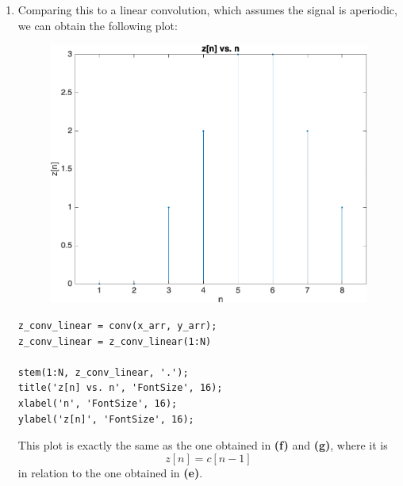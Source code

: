 \documentclass[12pt]{article}
\begin{document}
\begin{enumerate}[label=\textbf{\alph*)}, leftmargin=2.6em]
\item Comparing this to a linear convolution, which assumes the signal is aperiodic, we can obtain the following plot:
\begin{figure} [H]
    \centering
    \includegraphics[width=0.5\linewidth]{conv2.png}
\end{figure}
\begin{verbatim}
z_conv_linear = conv(x_arr, y_arr);
z_conv_linear = z_conv_linear(1:N)

stem(1:N, z_conv_linear, '.');
title('z[n] vs. n', 'FontSize', 16);
xlabel('n', 'FontSize', 16);
ylabel('z[n]', 'FontSize', 16);
\end{verbatim}
This plot is exactly the same as the one obtained in \textbf{(f)} and \textbf{(g)}, where it is
\begin{equation}
    z[n]=c[n-1]
\end{equation}
in relation to the one obtained in \textbf{(e)}.


\end{enumerate}
\end{document}
